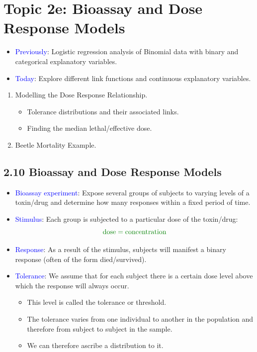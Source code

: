 \documentclass[oneside]{book}\usepackage[]{graphicx}\usepackage[svgnames]{xcolor}
\let\log\relax%
\begin{document}
\section*{Topic 2e: Bioassay and Dose Response Models}
\begin{itemize}
    \item \textcolor{Blue}{Previously}: Logistic regression analysis of Binomial data with binary and
          categorical explanatory variables.
    \item \textcolor{Blue}{Today}: Explore different link functions and continuous explanatory variables.
\end{itemize}
\begin{enumerate}[1.]
    \item Modelling the Dose Response Relationship.
          \begin{itemize}
              \item Tolerance distributions and their associated links.
              \item Finding the median lethal/effective dose.
          \end{itemize}
    \item Beetle Mortality Example.
\end{enumerate}
\subsection*{2.10 Bioassay and Dose Response Models}
\begin{itemize}
    \item \textcolor{Blue}{Bioassay experiment}: Expose several groups of subjects to varying levels of a
          toxin/drug and determine how many responses within a fixed period of time.
    \item \textcolor{Blue}{Stimulus}: Each group is subjected to a particular dose of the toxin/drug:
          \[ \textcolor{Green}{\text{dose}=\log{\text{concentration}}} \]
    \item \textcolor{Blue}{Response}: As a result of the stimulus, subjects will manifest a binary response
          (often of the form died/survived).
    \item \textcolor{Blue}{Tolerance}: We assume that for each subject there is a certain dose level above
          which the response will always occur.
          \begin{itemize}
              \item This level is called the tolerance or threshold.
              \item The tolerance varies from one individual to another in the population and therefore
                    from subject to subject in the sample.
              \item We can therefore ascribe a distribution to it.
          \end{itemize}
\end{itemize}
\end{document}
